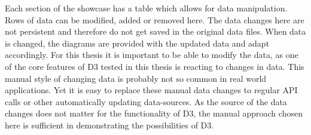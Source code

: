 Each section of the showcase has a table which allows for data manipulation. Rows of data can be modified, added or removed here. The data changes here are not persistent and therefore do not get saved in the original data files. When data is changed, the diagrams are provided with the updated data and adapt accordingly. For this thesis it is important to be able to modify the data, as one of the core features of D3 tested in this thesis is reacting to changes in data. This manual style of changing data is probably not so common in real world applications. Yet it is easy to replace these manual data changes to regular API calls or other automatically updating data-sources. As the source of the data changes does not matter for the functionality of D3, the manual approach chosen here is sufficient in demonstrating the possibilities of D3.
